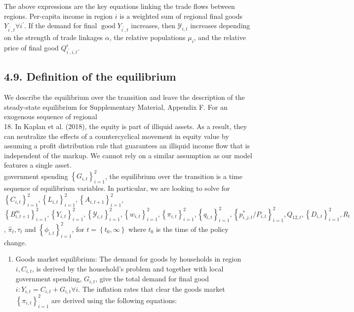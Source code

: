 \documentclass[10pt]{article}
\begin{document}
The above expressions are the key equations linking the trade flows between regions. Per-capita income in region $i$ is a weighted sum of regional final goods $Y_{i^{\prime}, t} \forall i^{\prime}$. If the demand for final $\operatorname{good} Y_{i^{\prime}, t}$ increases, then $\mathcal{Y}_{i, t}$ increases depending on the strength of trade linkages $\alpha$, the relative populations $\mu_{i}$, and the relative price of final good $Q_{i^{\prime}, i, t}^{\epsilon}$.

\subsection*{4.9. Definition of the equilibrium}
We describe the equilibrium over the transition and leave the description of the steady-state equilibrium for Supplementary Material, Appendix F. For an exogenous sequence of regional\\
18. In Kaplan et al. (2018), the equity is part of illiquid assets. As a result, they can neutralize the effects of a countercyclical movement in equity value by assuming a profit distribution rule that guarantees an illiquid income flow that is independent of the markup. We cannot rely on a similar assumption as our model features a single asset.\\
government spending $\left\{G_{i, t}\right\}_{i=1}^{2}$, the equilibrium over the transition is a time sequence of equilibrium variables. In particular, we are looking to solve for $\left\{C_{i, t}\right\}_{i=1}^{2},\left\{L_{i, t}\right\}_{i=1}^{2},\left\{A_{i, t+1}\right\}_{i=1}^{2}$, $\left\{B_{i, t+1}^{m}\right\}_{i=1}^{2},\left\{Y_{i, t}\right\}_{i=1}^{2},\left\{\mathcal{Y}_{i, t}\right\}_{i=1}^{2},\left\{w_{i, t}\right\}_{i=1}^{2},\left\{\pi_{i, t}\right\}_{i=1}^{2},\left\{q_{i, t}\right\}_{i=1}^{2},\left\{p_{i, j, t}^{*} / P_{i, t}\right\}_{i=1}^{2}, Q_{12, t},\left\{D_{i, t}\right\}_{i=1}^{2}, R_{t}$, $\hat{\pi}_{t}, \tau_{t}$ and $\left\{\phi_{i, t}\right\}_{i=1}^{2}$, for $t=\left\{t_{0}, \infty\right\}$ where $t_{0}$ is the time of the policy change.

\begin{enumerate}
  \item Goods market equilibrium: The demand for goods by households in region $i, C_{i, t}$, is derived by the household's problem and together with local government spending, $G_{i, t}$, give the total demand for final good $i: Y_{i, t}=C_{i, t}+G_{i, t} \forall i$. The inflation rates that clear the goods market $\left\{\pi_{i, t}\right\}_{i=1}^{2}$ are derived using the following equations:
\end{enumerate}
\end{document}
